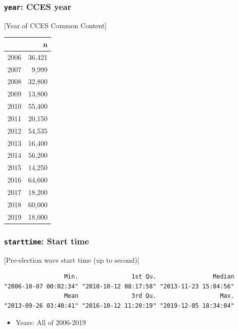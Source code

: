 \documentclass[10pt,article,oneside]{memoir}
\theoremstyle{definition}
\begin{document}
\hypertarget{year-cces-year}{%
\subsubsection{\texorpdfstring{\texttt{year}: CCES
year}{year: CCES year}}\label{year-cces-year}}

{[}Year of CCES Common Content{]}

\begin{table}[H]
\centering
\begin{tabular}{lr}
\toprule
 & n\\
\midrule
2006 & 36,421\\
2007 & 9,999\\
2008 & 32,800\\
2009 & 13,800\\
2010 & 55,400\\
2011 & 20,150\\
2012 & 54,535\\
2013 & 16,400\\
2014 & 56,200\\
2015 & 14,250\\
2016 & 64,600\\
2017 & 18,200\\
2018 & 60,000\\
2019 & 18,000\\
\bottomrule
\end{tabular}
\end{table}

\hypertarget{starttime-start-time}{%
\subsubsection{\texorpdfstring{\texttt{starttime}: Start
time}{starttime: Start time}}\label{starttime-start-time}}

{[}Pre-election wave start time (up to second){]}

\begin{verbatim}
                 Min.               1st Qu.                Median 
"2006-10-07 00:02:34" "2010-10-12 08:17:58" "2013-11-23 15:04:56" 
                 Mean               3rd Qu.                  Max. 
"2013-09-26 03:40:41" "2016-10-12 11:20:19" "2019-12-05 18:34:04" 
\end{verbatim}

\begin{itemize}
\tightlist
\item
  Years: All of 2006-2019
\end{itemize}
\end{document}
